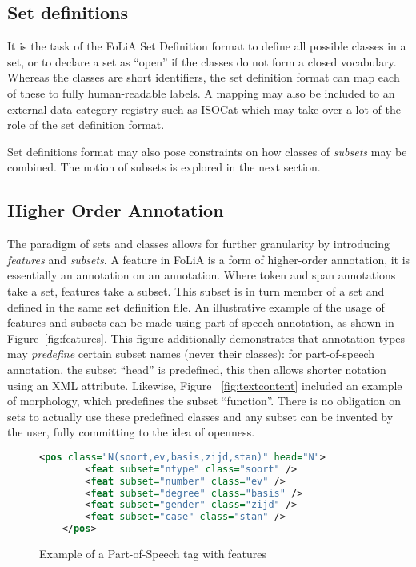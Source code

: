 \documentclass[a4paper,10pt,twoside]{article}
\begin{document}



\subsection{Set definitions}

It is the task of the FoLiA Set Definition format to define all possible
classes in a set, or to declare a set as ``open'' if the classes do not form a
closed vocabulary. Whereas the classes are short identifiers, the set
definition format can map each of these to fully human-readable labels. A
mapping may also be included to an external data category registry such as
ISOCat \cite{ISOCAT} which may take over a lot of the role of the set
definition format.

Set definitions format may also pose constraints on how classes of
\emph{subsets} may be combined. The notion of subsets is explored in the next
section.

\subsection{Higher Order Annotation}
\label{sec:higherorder}

The paradigm of sets and classes allows for further granularity by introducing
\emph{features} and \emph{subsets}. A feature in FoLiA is a form of
higher-order annotation, it is essentially an annotation on an annotation.
Where token and span annotations take a set, features take a subset. This
subset is in turn member of a set and defined in the same set definition file.
An illustrative example of the usage of features and subsets can be made using
part-of-speech annotation, as shown in Figure~\ref{fig:features}. This figure
additionally demonstrates that annotation types may \emph{predefine} certain subset
names (never their classes): for part-of-speech annotation, the subset ``head''
is predefined, this then allows shorter notation using an XML attribute.  Likewise,
Figure~ \ref{fig:textcontent} included an example of morphology, which predefines
the subset ``function''. There is no obligation on sets to actually use these
predefined classes and any subset can be invented by the user, fully committing
to the idea of openness. %

\begin{figure}[tbh]

\label{fig:spanannotation}
\begin{lstlisting}[language=xml]
    <pos class="N(soort,ev,basis,zijd,stan)" head="N">
        <feat subset="ntype" class="soort" />
        <feat subset="number" class="ev" />
        <feat subset="degree" class="basis" />
        <feat subset="gender" class="zijd" />
        <feat subset="case" class="stan" />
    </pos>
\end{lstlisting}
\caption{Example of a Part-of-Speech tag with features}
\end{figure}
\end{document}
